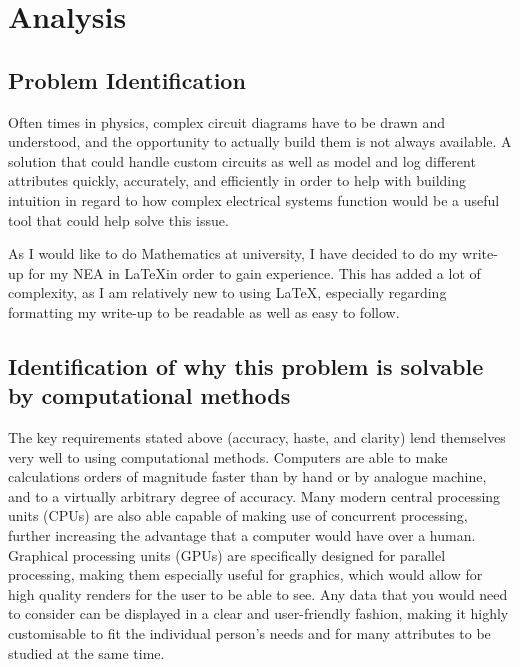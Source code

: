\chapter{Analysis}
\graphicspath{{figures}}

\section{Problem Identification}

    Often times in physics, complex circuit diagrams have to be drawn and understood, and the opportunity to actually build them is not always available. A solution that could handle custom circuits as well as model and log different attributes quickly, accurately, and efficiently in order to help with building intuition in regard to how complex electrical systems function would be a useful tool that could help solve this issue.

    As I would like to do Mathematics at university, I have decided to do my write-up for my NEA in \LaTeX in order to gain experience. This has added a lot of complexity, as I am relatively new to using \LaTeX, especially regarding formatting my write-up to be readable as well as easy to follow.

\section{Identification of why this problem is solvable by computational methods}

    The key requirements stated above (accuracy, haste, and clarity) lend themselves very well to using computational methods. 
    Computers are able to make calculations orders of magnitude faster than by hand or by analogue machine, and to a virtually arbitrary degree of accuracy. 
    Many modern central processing units (CPUs) are also able capable of making use of concurrent processing, further increasing the advantage that a computer would have over a human.
    Graphical processing units (GPUs) are specifically designed for parallel processing, making them especially useful for graphics, which would allow for high quality renders for the user to be able to see. 
    Any data that you would need to consider can be displayed in a clear and user-friendly fashion, making it highly customisable to fit the individual person's needs and for many attributes to be studied at the same time.

    
